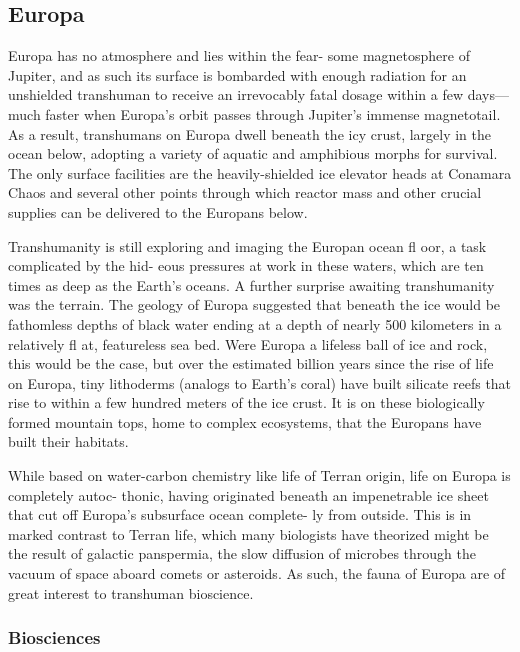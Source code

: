 \subsection{Europa}

Europa has no atmosphere and lies within the fear-
some magnetosphere of Jupiter, and as such its surface 
is bombarded with enough radiation for an unshielded 
transhuman to receive an irrevocably fatal dosage 
within a few days—much faster when Europa's orbit 
passes through Jupiter's immense magnetotail. As a 
result, transhumans on Europa dwell beneath the icy 
crust, largely in the ocean below, adopting a variety of 
aquatic and amphibious morphs for survival. The only 
surface facilities are the heavily-shielded ice elevator 
heads at Conamara Chaos and several other points 
through which reactor mass and other crucial supplies 
can be delivered to the Europans below.

Transhumanity is still exploring and imaging the 
Europan ocean fl oor, a task complicated by the hid-
eous pressures at work in these waters, which are ten 
times as deep as the Earth's oceans. A further surprise 
awaiting transhumanity was the terrain. The geology 
of Europa suggested that beneath the ice would be 
fathomless depths of black water ending at a depth of 
nearly 500 kilometers in a relatively fl at, featureless 
sea bed. Were Europa a lifeless ball of ice and rock, 
this would be the case, but over the estimated billion 
years since the rise of life on Europa, tiny lithoderms 
(analogs to Earth's coral) have built silicate reefs that 
rise to within a few hundred meters of the ice crust. It 
is on these biologically formed mountain tops, home 
to complex ecosystems, that the Europans have built 
their habitats.

While based on water-carbon chemistry like life 
of Terran origin, life on Europa is completely autoc-
thonic, having originated beneath an impenetrable ice 
sheet that cut off Europa's subsurface ocean complete-
ly from outside. This is in marked contrast to Terran 
life, which many biologists have theorized might be 
the result of galactic panspermia, the slow diffusion of 
microbes through the vacuum of space aboard comets 
or asteroids. As such, the fauna of Europa are of great 
interest to transhuman bioscience.

\subsubsection{Biosciences}

